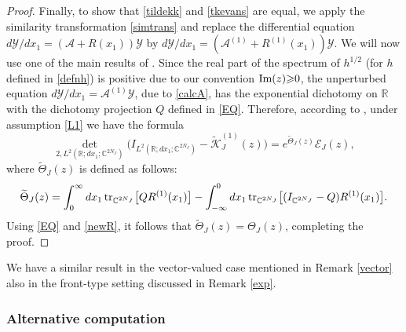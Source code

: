 \begin{proof}
Finally, to show that \eqref{tildekk} and
\eqref{tkevans} are equal,
we apply the similarity transformation \eqref{simtrans}
and replace the differential equation $d {{\mathcal Y}}/d x_1=({{\mathcal A}}+R(x_1)){{\mathcal Y}}$
by $d {{\mathcal Y}}/dx_1 =({{\mathcal A}}^{(1)}+R^{(1)}(x_1)){{\mathcal Y}}$.
We will now use one of the main results of \cite{GLM07}.
Since the real part of the spectrum of $h^{1/2}$ (for 
$h$ defined in \eqref{defnh}) is positive due to our convention ${\text{\rm Im}}(z){\geqslant} 0$,
the unperturbed
equation $d {{\mathcal Y}}/dx_1 ={{\mathcal A}}^{(1)}{{\mathcal Y}}$,
due to \eqref{calcA}, has the exponential
dichotomy on ${{\mathbb{R}}}$ with the dichotomy projection $Q$ defined
in \eqref{EQ}.  Therefore, according to \cite[Theorem 8.37]{GLM07}, under
assumption \eqref{L1} we have the formula
\begin{equation}
{\det}_{2,L^2({{\mathbb{R}}}; dx_1;{{\mathbb{C}}}^{2N_J})}
\big(I_{L^2({{\mathbb{R}}}; dx_1;{{\mathbb{C}}}^{2N_J})}- \widetilde{{\mathcal K}}^{(1)}_J(z)\big)
= e^{{\widetilde\Theta}_J(z)}{{\mathcal E}}_J(z),  
\end{equation}
where $\widetilde\Theta_J(z)$ is defined as follows:
\begin{equation}
\widetilde\Theta_J(z)=\int_0^\infty dx_1\, {\text{\rm{tr}}}_{{{\mathbb{C}}}^{2N_J}}
\big[ QR^{(1)}(x_1)\big]- \int_{-\infty}^0 dx_1 \, 
{\text{\rm{tr}}}_{{{\mathbb{C}}}^{2N_J}} \big[(I_{{{\mathbb{C}}}^{2N_J}}- Q)R^{(1)}(x_1)\big].
\end{equation}
Using \eqref{EQ} and \eqref{newR}, it follows that
$\widetilde\Theta_J(z)=\Theta_J(z)$, completing the proof. 
\end{proof}

\begin{remark}\label{vector2}
We have a similar result in the vector-valued case mentioned
in Remark \ref{vector} also in the front-type setting discussed
in Remark \ref{exp}.
\end{remark}

\subsubsection{Alternative computation}\label{alt}

